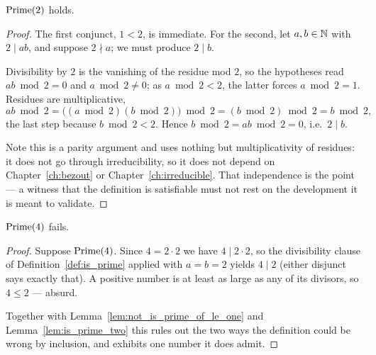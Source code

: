 \begin{lemma}
  \leanok
  \label{lem:is_prime_two}
  $\mathrm{Prime}(2)$ holds.
\end{lemma}
\begin{proof}
  \leanok
  The first conjunct, $1 < 2$, is immediate. For the second, let $a, b \in \mathbb{N}$
  with $2 \mid ab$, and suppose $2 \nmid a$; we must produce $2 \mid b$.

  Divisibility by $2$ is the vanishing of the residue mod $2$, so the hypotheses
  read $ab \bmod 2 = 0$ and $a \bmod 2 \neq 0$; as $a \bmod 2 < 2$, the latter
  forces $a \bmod 2 = 1$. Residues are multiplicative,
  \[
    ab \bmod 2 = \bigl( (a \bmod 2)(b \bmod 2) \bigr) \bmod 2
      = (b \bmod 2) \bmod 2 = b \bmod 2 ,
  \]
  the last step because $b \bmod 2 < 2$. Hence $b \bmod 2 = ab \bmod 2 = 0$,
  i.e.\ $2 \mid b$.

  Note this is a parity argument and uses nothing but multiplicativity of
  residues: it does not go through irreducibility, so it does not depend on
  Chapter~\ref{ch:bezout} or Chapter~\ref{ch:irreducible}. That independence is
  the point --- a witness that the definition is satisfiable must not rest on the
  development it is meant to validate.
\end{proof}

\begin{lemma}
  \leanok
  \label{lem:not_is_prime_four}
  $\mathrm{Prime}(4)$ fails.
\end{lemma}
\begin{proof}
  \leanok
  Suppose $\mathrm{Prime}(4)$. Since $4 = 2 \cdot 2$ we have $4 \mid 2 \cdot 2$, so the
  divisibility clause of Definition~\ref{def:is_prime} applied with
  $a = b = 2$ yields $4 \mid 2$ (either disjunct says exactly that). A positive
  number is at least as large as any of its divisors, so $4 \le 2$ --- absurd.

  Together with Lemma~\ref{lem:not_is_prime_of_le_one} and
  Lemma~\ref{lem:is_prime_two} this rules out the two ways the definition could
  be wrong by inclusion, and exhibits one number it does admit.
\end{proof}

